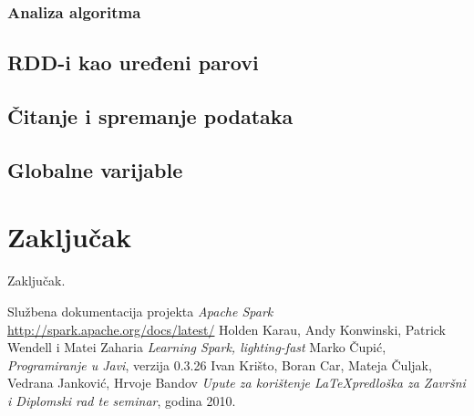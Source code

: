 \documentclass[times, utf8, zavrsni]{fer}
\begin{document}
\subsection{Analiza algoritma}
\section{RDD-i kao uređeni parovi}
\section{Čitanje i spremanje podataka}
\section{Globalne varijable}
\chapter{Zaključak} 
Zaključak.

\begin{thebibliography}{9}
  Službena dokumentacija projekta \emph{Apache Spark} \url{http://spark.apache.org/docs/latest/}
  Holden Karau, Andy Konwinski, Patrick Wendell i Matei Zaharia
  \emph{Learning Spark, lighting-fast}
  Marko Čupić,
  \emph{Programiranje u Javi},
  verzija 0.3.26
  Ivan Krišto, Boran Car, Mateja Čuljak, Vedrana Janković, Hrvoje Bandov
  \emph{Upute za korištenje \LaTeX predloška za Završni i Diplomski rad te seminar},
  godina 2010.
\end{thebibliography}
\end{document}
